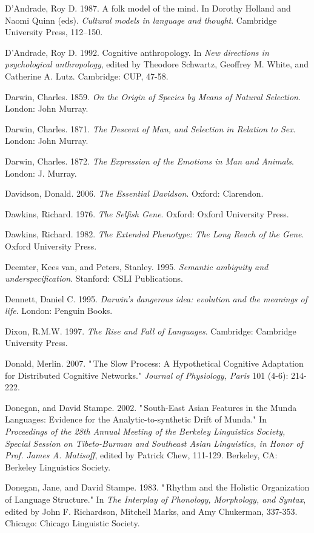 D'Andrade, Roy D. 1987. A folk model of the mind. In Dorothy Holland and 
Naomi Quinn (eds). \textit{Cultural models in language and thought}. 
Cambridge University Press, 112--150.

D'Andrade, Roy D. 1992. Cognitive anthropology. In \textit{New 
directions in psychological anthropology}, edited by Theodore 
Schwartz, Geoffrey M. White, and Catherine A. Lutz. Cambridge: CUP, 
47-58.

Darwin, Charles. 1859. \textit{On the Origin of Species by Means of 
Natural Selection}. London: John Murray.

Darwin, Charles. 1871. \textit{The Descent of Man, and Selection in 
Relation to Sex}. London: John Murray.

Darwin, Charles. 1872. \textit{The Expression of the Emotions in Man 
and Animals}. London: J. Murray.

Davidson, Donald. 2006. \textit{The Essential Davidson}. Oxford: 
Clarendon.

Dawkins, Richard. 1976. \textit{The Selfish Gene}. Oxford: Oxford 
University Press.

Dawkins, Richard. 1982. \textit{The Extended Phenotype: The Long Reach 
of the Gene}. Oxford University Press.

Deemter, Kees van, and Peters, Stanley. 1995. \textit{Semantic 
ambiguity and underspecification}. Stanford: CSLI Publications.

Dennett, Daniel C. 1995. \textit{Darwin's dangerous idea: evolution and 
the meanings of life}. London: Penguin Books.

Dixon, R.M.W. 1997. \textit{The Rise and Fall of Languages}. 
Cambridge: Cambridge University Press.

Donald, Merlin. 2007. "\,The Slow Process: A Hypothetical Cognitive 
Adaptation for Distributed Cognitive Networks." \textit{Journal of 
Physiology, Paris} 101 (4-6): 214-222.

Donegan, and David Stampe. 2002. "\,South-East Asian Features in the 
Munda Languages: Evidence for the Analytic-to-synthetic Drift of Munda." 
In \textit{Proceedings of the 28th Annual Meeting of the Berkeley 
Linguistics Society, Special Session on Tibeto-Burman and Southeast 
Asian Linguistics, in Honor of Prof. James A. Matisoff}, edited by 
Patrick Chew, 111-129. Berkeley, CA: Berkeley Linguistics Society.

Donegan, Jane, and David Stampe. 1983. "\,Rhythm and the Holistic 
Organization of Language Structure." In \textit{The Interplay of 
Phonology, Morphology, and Syntax}, edited by John F. Richardson, 
Mitchell Marks, and Amy Chukerman, 337-353. Chicago: Chicago Linguistic 
Society.

